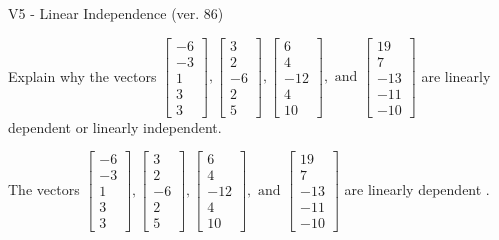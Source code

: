 \begin{exercise}
  \begin{exerciseTitle}V5 - Linear Independence (ver. 86)\end{exerciseTitle}
  \begin{exerciseStatement}
    Explain why the vectors \(\left[\begin{array}{r}
-6 \\
-3 \\
1 \\
3 \\
3
\end{array}\right] , \left[\begin{array}{r}
3 \\
2 \\
-6 \\
2 \\
5
\end{array}\right] , \left[\begin{array}{r}
6 \\
4 \\
-12 \\
4 \\
10
\end{array}\right] , \text{ and } \left[\begin{array}{r}
19 \\
7 \\
-13 \\
-11 \\
-10
\end{array}\right]\) are linearly dependent or linearly independent.	


  \end{exerciseStatement}
  \begin{exerciseAnswer}
   The vectors \(\left[\begin{array}{r}
-6 \\
-3 \\
1 \\
3 \\
3
\end{array}\right] , \left[\begin{array}{r}
3 \\
2 \\
-6 \\
2 \\
5
\end{array}\right] , \left[\begin{array}{r}
6 \\
4 \\
-12 \\
4 \\
10
\end{array}\right] , \text{ and } \left[\begin{array}{r}
19 \\
7 \\
-13 \\
-11 \\
-10
\end{array}\right]\) are 
  	 linearly dependent  .
  


  \end{exerciseAnswer}
\end{exercise}